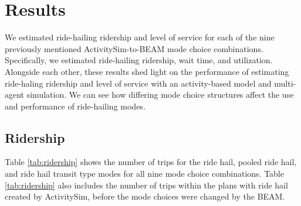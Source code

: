 \documentclass[fancy, masters]{byuthesis}
\begin{document}
\hypertarget{results}{%
\chapter{Results}\label{results}}

We estimated ride-hailing ridership and level of service for each of the nine previously mentioned ActivitySim-to-BEAM mode choice combinations. Specifically, we estimated ride-hailing ridership, wait time, and utilization. Alongside each other, these results shed light on the performance of estimating ride-haling ridership and level of service with an activity-based model and multi-agent simulation. We can see how differing mode choice structures affect the use and performance of ride-hailing modes.

\hypertarget{res-ridership}{%
\section{Ridership}\label{res-ridership}}

Table \ref{tab:ridership} shows the number of trips for the ride hail, pooled ride hail, and ride hail transit type modes for all nine mode choice combinations. Table \ref{tab:ridership} also includes the number of trips within the plans with ride hail created by ActivitySim, before the mode choices were changed by the BEAM.
\end{document}
